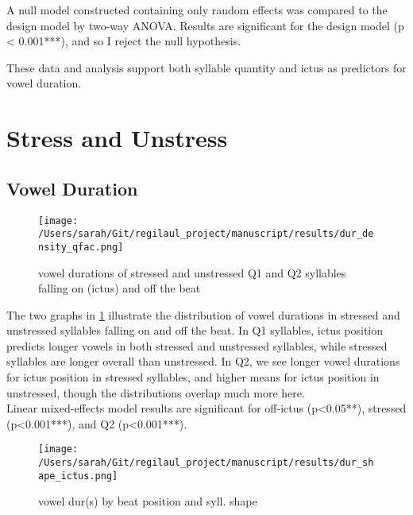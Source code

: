  
A null model constructed containing only random effects was compared to the design model by two-way ANOVA. Results are significant for the design model (p < 0.001***), and so I reject the null hypothesis. 

These data and analysis support both syllable quantity and ictus as predictors for vowel duration. 



%
%
%
%
\section{Stress and Unstress}


\subsection{Vowel Duration}

\begin{figure}[htbp]
\centering
\texttt{[image: /Users/sarah/Git/regilaul\_project/manuscript/results/dur\_density\_qfac.png]}
\caption{vowel durations of stressed and unstressed Q1 and Q2 syllables falling on (ictus) and off the beat}
\label{durstrick}
\end{figure}

The two graphs in \ref{durstrick} illustrate the distribution of vowel durations in stressed and unstressed syllables falling on and off the beat. In Q1 syllables, ictus position predicts longer vowels in both stressed and unstressed syllables, while stressed syllables are longer overall than unstressed. In Q2, we see longer vowel durations for ictus position in stressed syllables, and higher means for ictus position in unstressed, though the distributions overlap much more here. \\

Linear mixed-effects model results are significant for off-ictus (p<0.05**), stressed (p<0.001***), and Q2 (p<0.001***). 

\begin{figure}[htpb]
\centering
\texttt{[image: /Users/sarah/Git/regilaul\_project/manuscript/results/dur\_shape\_ictus.png]}
\caption{vowel dur(s) by beat position and syll. shape}
\label{ickdursh}
\end{figure}

